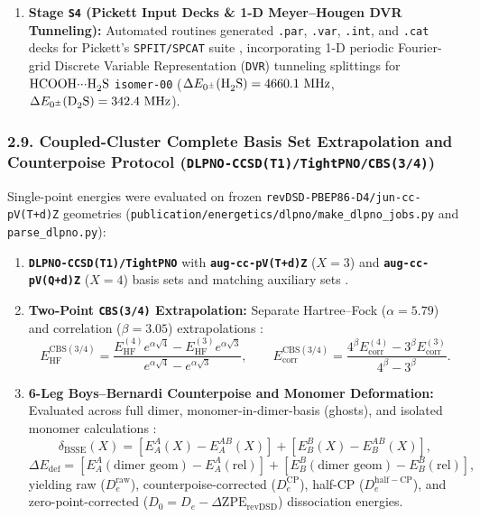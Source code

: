 \documentclass[journal=jpclcd,manuscript=article]{achemso}
\begin{document}
\begin{enumerate}
  \item \textbf{Stage \texttt{S4} (Pickett Input Decks \& 1-D Meyer--Hougen DVR Tunneling):} Automated routines generated \texttt{.par}, \texttt{.var}, \texttt{.int}, and \texttt{.cat} decks for Pickett's \texttt{SPFIT/SPCAT} suite \cite{Pickett1991}, incorporating 1-D periodic Fourier-grid Discrete Variable Representation (\texttt{DVR}) \cite{Colbert1992, Meyer1968} tunneling splittings for $\ce{HCOOH\bond{...}H2S}$ \texttt{isomer-00} ($\Delta E_{0^\pm}(\ce{H2S}) = 4660.1\text{ MHz}$, $\Delta E_{0^\pm}(\ce{D2S}) = 342.4\text{ MHz}$).
\end{enumerate}

\subsubsection{2.9. Coupled-Cluster Complete Basis Set Extrapolation and Counterpoise Protocol (\texttt{DLPNO-CCSD(T1)/TightPNO/CBS(3/4)})}
Single-point energies were evaluated on frozen \texttt{revDSD-PBEP86-D4/jun-cc-pV(T+d)Z} geometries (\texttt{publication/energetics/dlpno/make\_dlpno\_jobs.py} and \texttt{parse\_dlpno.py}):
\begin{enumerate}
  \item \textbf{\texttt{DLPNO-CCSD(T1)/TightPNO}} \cite{Riplinger2013, Riplinger2016, Saitow2017, Liakos2015} with \textbf{\texttt{aug-cc-pV(T+d)Z}} ($X=3$) and \textbf{\texttt{aug-cc-pV(Q+d)Z}} ($X=4$) basis sets \cite{Dunning1989, Kendall1992, Dunning2001} and matching auxiliary sets \cite{Hattig2005}.
  \item \textbf{Two-Point \texttt{CBS(3/4)} Extrapolation:} Separate Hartree--Fock ($\alpha = 5.79$) and correlation ($\beta = 3.05$) extrapolations \cite{Helgaker1997, NeeseValeev2011}:
  \begin{equation}
    E_{\mathrm{HF}}^{\mathrm{CBS}(3/4)} = \frac{E_{\mathrm{HF}}^{(4)} e^{\alpha\sqrt{4}} - E_{\mathrm{HF}}^{(3)} e^{\alpha\sqrt{3}}}{e^{\alpha\sqrt{4}} - e^{\alpha\sqrt{3}}}, \qquad E_{\mathrm{corr}}^{\mathrm{CBS}(3/4)} = \frac{4^\beta E_{\mathrm{corr}}^{(4)} - 3^\beta E_{\mathrm{corr}}^{(3)}}{4^\beta - 3^\beta}.
  \end{equation}
  \item \textbf{6-Leg Boys--Bernardi Counterpoise and Monomer Deformation:} Evaluated across full dimer, monomer-in-dimer-basis (ghosts), and isolated monomer calculations \cite{Boys1970}:
  \begin{equation}
    \delta_{\mathrm{BSSE}}(X) = \left[E_A^A(X) - E_A^{AB}(X)\right] + \left[E_B^B(X) - E_B^{AB}(X)\right],
  \end{equation}
  \begin{equation}
    \Delta E_{\mathrm{def}} = \left[E_A^A(\text{dimer geom}) - E_A^A(\text{rel})\right] + \left[E_B^B(\text{dimer geom}) - E_B^B(\text{rel})\right],
  \end{equation}
  yielding raw ($D_e^{\mathrm{raw}}$), counterpoise-corrected ($D_e^{\mathrm{CP}}$), half-CP ($D_e^{\mathrm{half-CP}}$), and zero-point-corrected ($D_0 = D_e - \Delta\mathrm{ZPE}_{\mathrm{revDSD}}$) dissociation energies.
\end{enumerate}
\end{document}
